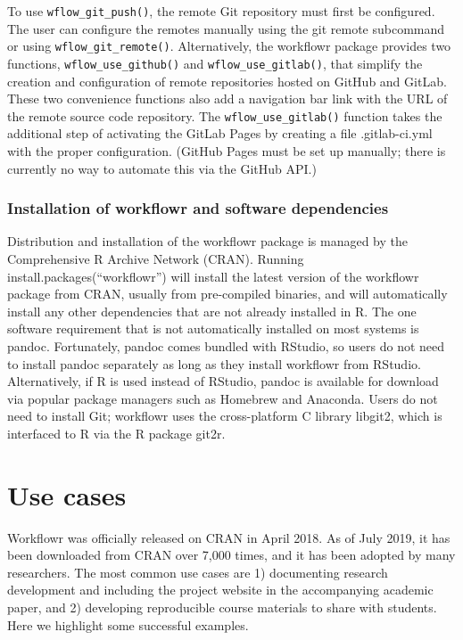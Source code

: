 \documentclass[9pt,a4paper]{extarticle}
\begin{document}
To use \texttt{wflow\_git\_push()}, the remote Git repository must first be
configured. The user can configure the remotes manually using the git
remote subcommand or using \texttt{wflow\_git\_remote()}. Alternatively, the
workflowr package provides two functions, \texttt{wflow\_use\_github()} and
\texttt{wflow\_use\_gitlab()}, that simplify the creation and configuration of
remote repositories hosted on GitHub and GitLab. These two convenience
functions also add a navigation bar link with the URL of the remote
source code repository. The \texttt{wflow\_use\_gitlab()} function takes the
additional step of activating the GitLab Pages by creating a file
.gitlab-ci.yml with the proper configuration. (GitHub Pages must be set
up manually; there is currently no way to automate this via the GitHub
API.)

\subsubsection*{Installation of workflowr and software dependencies}

Distribution and installation of the workflowr package is managed by the
Comprehensive R Archive Network (CRAN). Running
install.packages(“workflowr”) will install the latest version of the
workflowr package from CRAN, usually from pre-compiled binaries, and
will automatically install any other dependencies that are not already
installed in R. The one software requirement that is not automatically
installed on most systems is pandoc. Fortunately, pandoc comes bundled
with RStudio, so users do not need to install pandoc separately as long
as they install workflowr from RStudio. Alternatively, if R is used
instead of RStudio, pandoc is available for download via popular package
managers such as Homebrew and Anaconda. Users do not need to install
Git; workflowr uses the cross-platform C library libgit2, which is
interfaced to R via the R package git2r.


\section*{Use cases}

Workflowr was officially released on CRAN in April 2018. As of July
2019, it has been downloaded from CRAN over 7,000 times, and it has been
adopted by many researchers. The most common use cases are 1)
documenting research development and including the project website in
the accompanying academic paper, and 2) developing reproducible course
materials to share with students. Here we highlight some successful
examples.
\end{document}
